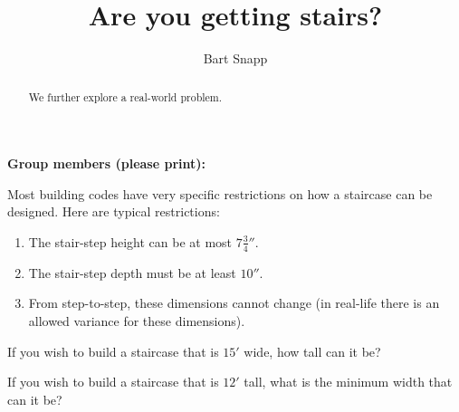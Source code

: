 \documentclass[handout,noauthor,nooutcomes]{ximera}
\title{Are you getting stairs?}
\author{Bart Snapp}
\begin{document}
\begin{abstract}
  We further explore a real-world problem.
\end{abstract}
\maketitle


\noindent\textbf{Group members (please print):}\ \hrulefill \\

\hrulefill





Most building codes have very specific restrictions on how a staircase
can be designed. Here are typical restrictions:
\begin{enumerate}
\item The stair-step height can be at most $7\frac{3}{4}''$. 
\item The stair-step depth must be at least $10''$.
\item From step-to-step, these dimensions cannot change (in real-life there is
an allowed variance for these dimensions).
\end{enumerate}

\begin{problem} 
If you wish to build a staircase that is $15'$ wide, how tall can it
be?
\end{problem}

\begin{problem} 
If you wish to build a staircase that is $12'$ tall, what is the minimum width that can it
be?
\end{problem}
\end{document}
